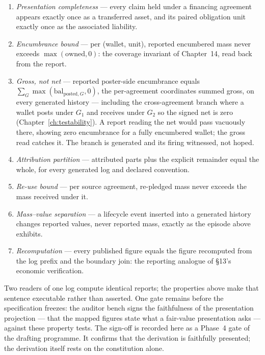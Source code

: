 \documentclass[11pt,a4paper]{article}
\begin{document}
\begin{enumerate}[nosep]
\item \emph{Presentation completeness} --- every claim held under a financing
  agreement appears exactly once as a transferred asset, and its paired
  obligation unit exactly once as the associated liability.
\item \emph{Encumbrance bound} --- per (wallet, unit), reported encumbered mass
  never exceeds $\max(\text{owned}, 0)$: the coverage invariant of Chapter~14,
  read back from the report.
\item \emph{Gross, not net} --- reported poster-side encumbrance equals
  $\sum_G \max(\mathrm{bal}_{\text{posted},G}, 0)$, the per-agreement coordinates
  summed gross, on every generated history --- including the cross-agreement branch
  where a wallet posts under $G_1$ and receives under $G_2$ so the signed net is
  zero (Chapter~\ref{ch:testability}). A report reading the net would pass vacuously
  there, showing zero encumbrance for a fully encumbered wallet; the gross read
  catches it. The branch is generated and its firing witnessed, not hoped.
\item \emph{Attribution partition} --- attributed parts plus the explicit
  remainder equal the whole, for every generated log and declared convention.
\item \emph{Re-use bound} --- per source agreement, re-pledged mass never
  exceeds the mass received under it.
\item \emph{Mass--value separation} --- a lifecycle event inserted into a
  generated history changes reported values, never reported mass, exactly as
  the episode above exhibits.
\item \emph{Recomputation} --- every published figure equals the figure
  recomputed from the log prefix and the boundary join: the reporting analogue
  of \S 13's economic verification.
\end{enumerate}

Two readers of one log compute identical reports; the properties above make
that sentence executable rather than asserted. One gate remains before the
specification freezes: the auditor bench signs the faithfulness of the
presentation projection --- that the mapped figures state what a fair-value
presentation asks --- against these property tests. The sign-off is recorded
here as a Phase~4 gate of the drafting programme. It confirms that the
derivation is faithfully presented; the derivation itself rests on the
constitution alone.
\end{document}
